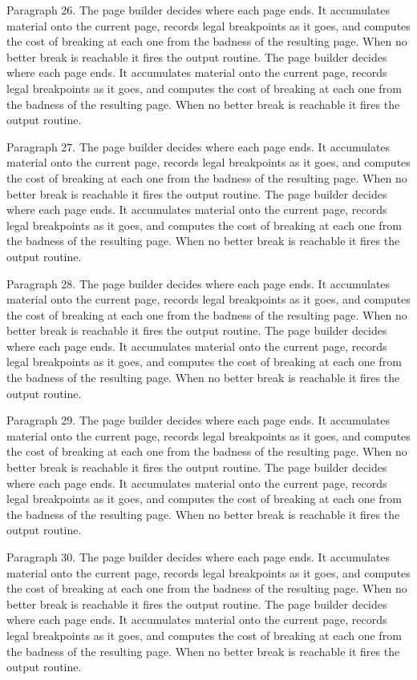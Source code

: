 Paragraph 26. The page builder decides where each page ends. It accumulates material onto the current page, records legal breakpoints as it goes, and computes the cost of breaking at each one from the badness of the resulting page. When no better break is reachable it fires the output routine. The page builder decides where each page ends. It accumulates material onto the current page, records legal breakpoints as it goes, and computes the cost of breaking at each one from the badness of the resulting page. When no better break is reachable it fires the output routine. 

Paragraph 27. The page builder decides where each page ends. It accumulates material onto the current page, records legal breakpoints as it goes, and computes the cost of breaking at each one from the badness of the resulting page. When no better break is reachable it fires the output routine. The page builder decides where each page ends. It accumulates material onto the current page, records legal breakpoints as it goes, and computes the cost of breaking at each one from the badness of the resulting page. When no better break is reachable it fires the output routine. 

Paragraph 28. The page builder decides where each page ends. It accumulates material onto the current page, records legal breakpoints as it goes, and computes the cost of breaking at each one from the badness of the resulting page. When no better break is reachable it fires the output routine. The page builder decides where each page ends. It accumulates material onto the current page, records legal breakpoints as it goes, and computes the cost of breaking at each one from the badness of the resulting page. When no better break is reachable it fires the output routine. 

Paragraph 29. The page builder decides where each page ends. It accumulates material onto the current page, records legal breakpoints as it goes, and computes the cost of breaking at each one from the badness of the resulting page. When no better break is reachable it fires the output routine. The page builder decides where each page ends. It accumulates material onto the current page, records legal breakpoints as it goes, and computes the cost of breaking at each one from the badness of the resulting page. When no better break is reachable it fires the output routine. 

Paragraph 30. The page builder decides where each page ends. It accumulates material onto the current page, records legal breakpoints as it goes, and computes the cost of breaking at each one from the badness of the resulting page. When no better break is reachable it fires the output routine. The page builder decides where each page ends. It accumulates material onto the current page, records legal breakpoints as it goes, and computes the cost of breaking at each one from the badness of the resulting page. When no better break is reachable it fires the output routine. 

